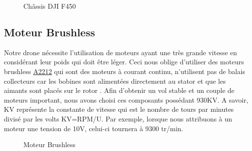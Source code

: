 \begin{figure} [H]
	\begin{center}
		\centering
	\end{center}
	\caption{Châssis DJI F450}
\end{figure}

\subsection{Moteur Brushless}
Notre drone nécessite l'utilisation de moteurs ayant une très grande vitesse en considérant leur poids qui doit être léger. Ceci nous oblige d'utiliser des moteurs brushless \underline{A2212} qui sont des moteurs à courant continu, n'utilisent pas de balais collecteurs car les bobines sont alimentées directement au stator et que les aimants sont placés sur le rotor \cite{Cube}. Afin d'obtenir un vol stable et un couple de moteurs important, nous avons choisi ces composants possédant 930KV. A savoir, KV représente la constante de vitesse qui est le nombre de tours par minutes divisé par les volts KV=RPM/U. Par exemple, lorsque nous attribuons à un moteur une tension de 10V, celui-ci tournera à 9300 tr/min. 
\begin{figure} [H]
	\begin{center}
		\centering
	\end{center}
	\caption{Moteur Brushless}
\end{figure}
